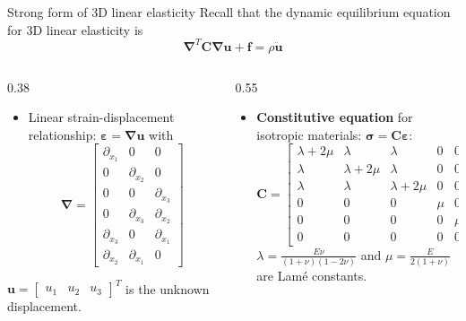 \documentclass[aspectratio=169]{beamer}
\begin{document}
\begin{frame}{Strong form of 3D linear elasticity}
  \small
  Recall that the dynamic equilibrium equation for 3D linear elasticity is
  $$\boldsymbol\nabla^T\mathbf C\boldsymbol\nabla\mathbf u+\mathbf f=\rho\ddot{\mathbf u}$$
  \vspace{-0.5cm}
  \begin{columns}[T,onlytextwidth]
    \begin{column}{0.38\textwidth}
      \begin{itemize}
        \item Linear strain-displacement relationship: $\boldsymbol\varepsilon=\boldsymbol\nabla\mathbf u$ with
              $$\boldsymbol\nabla=\begin{bmatrix} \partial_{x_1} & 0 & 0 \\ 0 & \partial_{x_2} & 0 \\ 0 & 0 & \partial_{x_3} \\ 0 & \partial_{x_3} & \partial_{x_2} \\ \partial_{x_3} & 0 & \partial_{x_1}  \\ \partial_{x_2} & \partial_{x_1} & 0 \end{bmatrix}$$
      \end{itemize}
      $\mathbf u=\begin{bmatrix} u_1 & u_2 & u_3\end{bmatrix}^T$ is the unknown displacement.
    \end{column}
    \begin{column}{0.55\textwidth}
      \begin{itemize}
        \item \textbf{Constitutive equation} for isotropic materials: $\boldsymbol\sigma=\mathbf C\boldsymbol\varepsilon$:
              \[
                \mathbf C=\begin{bmatrix}
                  \lambda+2\mu & \lambda      & \lambda      & 0   & 0   & 0   \\
                  \lambda      & \lambda+2\mu & \lambda      & 0   & 0   & 0   \\
                  \lambda      & \lambda      & \lambda+2\mu & 0   & 0   & 0   \\
                  0            & 0            & 0            & \mu & 0   & 0   \\
                  0            & 0            & 0            & 0   & \mu & 0   \\
                  0            & 0            & 0            & 0   & 0   & \mu
                \end{bmatrix}
              \]
              $\lambda=\frac{E\nu}{(1+\nu)(1-2\nu)}$ and $\mu=\frac{E}{2(1+\nu)}$ are Lamé constants.
      \end{itemize}
    \end{column}
  \end{columns}
\end{frame}
\end{document}
